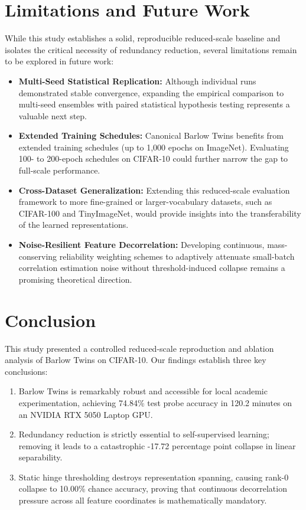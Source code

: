 \documentclass[conference]{IEEEtran}
\begin{document}
\section{Limitations and Future Work}
While this study establishes a solid, reproducible reduced-scale baseline and isolates the critical necessity of redundancy reduction, several limitations remain to be explored in future work:
\begin{itemize}
    \item \textbf{Multi-Seed Statistical Replication:} Although individual runs demonstrated stable convergence, expanding the empirical comparison to multi-seed ensembles with paired statistical hypothesis testing represents a valuable next step.
    \item \textbf{Extended Training Schedules:} Canonical Barlow Twins benefits from extended training schedules (up to 1,000 epochs on ImageNet). Evaluating 100- to 200-epoch schedules on CIFAR-10 could further narrow the gap to full-scale performance.
    \item \textbf{Cross-Dataset Generalization:} Extending this reduced-scale evaluation framework to more fine-grained or larger-vocabulary datasets, such as CIFAR-100 and TinyImageNet, would provide insights into the transferability of the learned representations.
    \item \textbf{Noise-Resilient Feature Decorrelation:} Developing continuous, mass-conserving reliability weighting schemes to adaptively attenuate small-batch correlation estimation noise without threshold-induced collapse remains a promising theoretical direction.
\end{itemize}

\section{Conclusion}
This study presented a controlled reduced-scale reproduction and ablation analysis of Barlow Twins on CIFAR-10. Our findings establish three key conclusions:
\begin{enumerate}
    \item Barlow Twins is remarkably robust and accessible for local academic experimentation, achieving 74.84\% test probe accuracy in 120.2 minutes on an NVIDIA RTX 5050 Laptop GPU.
    \item Redundancy reduction is strictly essential to self-supervised learning; removing it leads to a catastrophic -17.72 percentage point collapse in linear separability.
    \item Static hinge thresholding destroys representation spanning, causing rank-0 collapse to 10.00\% chance accuracy, proving that continuous decorrelation pressure across all feature coordinates is mathematically mandatory.
\end{enumerate}



\end{document}
